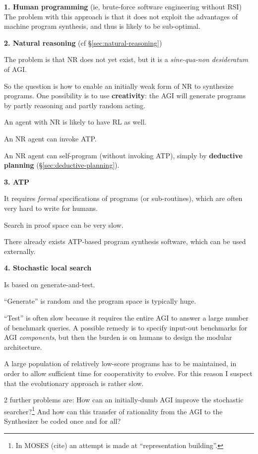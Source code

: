 \textbf{1. Human programming} (ie, brute-force software engineering without RSI)\\
The problem with this approach is that it does not exploit the advantages of machine program synthesis, and thus is likely to be sub-optimal.

\textbf{2. Natural reasoning} (cf \S\ref{sec:natural-reasoning})
\begin{compactenum}[(a)]
\item  The problem is that NR does not yet exist, but it is a \textit{sine-qua-non desideratum} of AGI.
\item  So the question is how to enable an initially weak form of NR to synthesize programs.  One possibility is to use \textbf{creativity}:  the AGI will generate programs by partly reasoning and partly random acting.
\item  An agent with NR is likely to have RL as well.
\item  An NR agent can invoke ATP.
\item  An NR agent can self-program (without invoking ATP), simply by \textbf{deductive planning} (\S\ref{sec:deductive-planning}).\\
\end{compactenum}

\textbf{3. ATP}
\begin{compactenum}[(a)]
\item  It requires \textit{formal} specifications of programs (or sub-routines), which are often very hard to write for humans.
\item  Search in proof space can be very slow.
\item  There already exists ATP-based program synthesis software, which can be used externally.\\
\end{compactenum}

\textbf{4. Stochastic local search}
\begin{compactenum}[(a)]
\item  Is based on generate-and-test.
\item  ``Generate'' is random and the program space is typically huge.
\item  ``Test'' is often slow because it requires the entire AGI to answer a large number of benchmark queries.  A possible remedy is to specify input-out benchmarks for AGI \textit{components}, but then the burden is on humans to design the modular architecture.
\item  A large population of relatively low-score programs has to be maintained, in order to allow sufficient time for cooperativity to evolve.  For this reason I suspect that the evolutionary approach is rather slow.
\item  2 further problems are:  How can an initially-dumb AGI improve the stochastic searcher?\footnote{In MOSES (cite) an attempt is made at ``representation building''.} And how can this transfer of rationality from the AGI to the Synthesizer be coded once and for all?\\
\end{compactenum}

